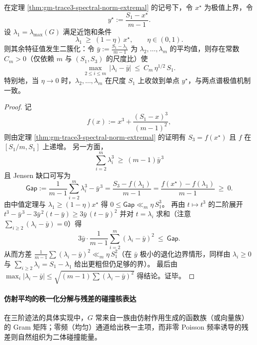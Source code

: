 \begin{proposition}\label{prop:gm-trace3-near-extremal-clustering}
在定理 \ref{thm:gm-trace3-spectral-norm-extremal} 的记号下，令 \(x^\star\) 为极值上界，令
\[
y^\star:=\frac{S_1-x^\star}{m-1}.
\]
设 \(\lambda_1=\lambda_{\max}(G)\) 满足近饱和条件
\[
\lambda_1\ \ge\ (1-\eta)\,x^\star,\qquad \eta\in(0,1).
\]
则其余特征值发生二簇化：令
\(
\bar y:=\frac{S_1-\lambda_1}{m-1}
\)
为 \(\lambda_2,\dots,\lambda_m\) 的平均值，则存在常数 \(C_m>0\)（仅依赖 \(m\) 与 \((S_1,S_3)\) 的尺度比）使
\[
\max_{2\le i\le m}\,|\lambda_i-\bar y|
\ \le\
C_m\,\eta^{1/2}\,S_1.
\]
特别地，当 \(\eta\to 0\) 时，\(\lambda_2,\dots,\lambda_m\) 在尺度 \(S_1\) 上收敛到单点 \(y^\star\)，与两点谱极值机制一致。
\end{proposition}

\begin{proof}
记
\[
f(x):=x^3+\frac{(S_1-x)^3}{(m-1)^2},
\]
则由定理 \ref{thm:gm-trace3-spectral-norm-extremal} 的证明有
\(
S_3=f(x^\star)
\) 且 \(f\) 在 \([S_1/m,S_1]\) 上递增。
另一方面，
\[
\sum_{i=2}^m\lambda_i^3
\ \ge\
(m-1)\bar y^{\,3}
\]
且 Jensen 缺口可写为
\[
\mathsf{Gap}
:=\frac{1}{m-1}\sum_{i=2}^m\lambda_i^3-\bar y^{\,3}
=\frac{S_3-f(\lambda_1)}{m-1}
=\frac{f(x^\star)-f(\lambda_1)}{m-1}\ \ge\ 0.
\]
由中值定理与 \(\lambda_1\ge(1-\eta)x^\star\) 得
\(
0\le \mathsf{Gap}\ll_m \eta\,S_1^3
\)。
再由 \(t\mapsto t^3\) 的二阶展开
\(
t^3-\bar y^{\,3}-3\bar y^{\,2}(t-\bar y)\ge 3\bar y\,(t-\bar y)^2
\)
并对 \(t=\lambda_i\) 求和（注意 \(\sum_{i\ge 2}(\lambda_i-\bar y)=0\)）得
\[
3\bar y\cdot \frac{1}{m-1}\sum_{i=2}^m(\lambda_i-\bar y)^2
\ \le\ \mathsf{Gap}.
\]
从而方差 \(\frac{1}{m-1}\sum(\lambda_i-\bar y)^2\ll_m \eta\,S_1^2\)（在 \(\bar y\) 极小的退化边界情形，同样由 \(\lambda_i\ge 0\) 与 \(\sum_{i\ge2}\lambda_i=S_1-\lambda_1\) 给出更粗但仍足够的界）。
最后由 \(\max_i|\lambda_i-\bar y|\le \sqrt{(m-1)\sum(\lambda_i-\bar y)^2}\) 得结论。证毕。
\end{proof}

\paragraph{仿射平均的秩一化分解与残差的碰撞核表达}
在三阶迹法的具体实现中，\(G\) 常来自一族由仿射作用生成的函数族（或向量族）的 Gram 矩阵；零频（均匀）通道给出秩一主项，而非零 Poisson 频率诱导的残差则自然组织为二体碰撞能量。


